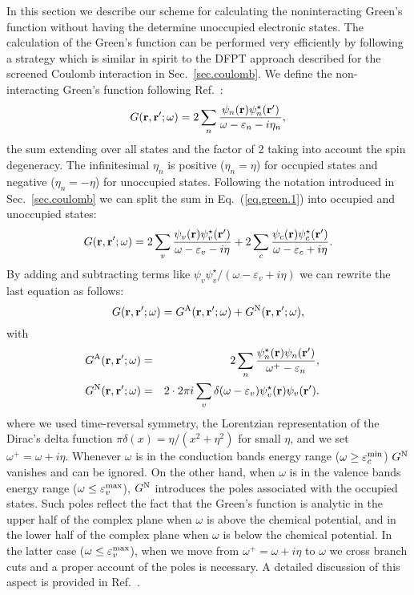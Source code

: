 \documentclass[twocolumn,prb,showpacs,superscriptaddress]{revtex4}
\def\w{\omega}
\def\E{\varepsilon}
\def\r{{\bf r}}
\def\rp{{\bf r^\prime}}
\begin{document}
In this section we describe our scheme for calculating the noninteracting
Green's function without having the determine unoccupied electronic states.
The calculation of the Green's function can be performed very efficiently
by following a strategy which is similar in spirit to the DFPT approach
described for the screened Coulomb interaction in Sec.\ \ref{sec.coulomb}.
We define the non-interacting Green's function following Ref.\ :
  \begin{equation}\label{eq.green.1}
  G(\r,\rp;\w) = 2\sum_n \frac{\psi_n(\r)\psi_n^\star(\rp)}{\w-\E_n-i\eta_n},
  \end{equation}
the sum extending over all states and the factor of 2 taking into account the
spin degeneracy.
The infinitesimal $\eta_n$ is positive ($\eta_n=\eta$) 
for occupied states and negative ($\eta_n=-\eta$) for unoccupied states.\cite{hl,hl86}
Following the notation introduced in Sec.\ \ref{sec.coulomb} we can split the
sum in Eq.~(\ref{eq.green.1}) into occupied and unoccupied states:
  \begin{equation}\label{eq.green.2}
  G(\r,\rp;\w) = 2\sum_v \frac{\psi_v(\r)\psi_v^\star(\rp)}{\w-\E_v-i\eta}
  + 2\sum_c \frac{\psi_c(\r)\psi_c^\star(\rp)}{\w-\E_c+i\eta}.
  \end{equation}
By adding and subtracting terms like $\psi_v\psi_v^\star/(\w-\E_v+i\eta)$
we can rewrite the last equation as follows:
  \begin{equation}\label{eq.green.split}
  G(\r,\rp;\w) = G^{\rm A}(\r,\rp;\w) + G^{\rm N}(\r,\rp;\w),
  \end{equation}
with 
  \begin{eqnarray}\label{eq.green.split.2}
\!\!\!\!\!\!  G^{\rm A}(\r,\rp;\w) & =&  2\sum_n \frac{\psi_n^\star(\r)\psi_n(\rp)}{\w^+-\E_n},  \\ 
\!\!\!\!\!\!  G^{\rm N}(\r,\rp;\w)  & = &  2\cdot 2\pi i \sum_v \delta(\w-\E_v) \psi_v^\star(\r)\psi_v(\rp). \label{eq.green.split.3} 
  \end{eqnarray}
where we used time-reversal symmetry, the Lorentzian representation of the Dirac's delta function
$\pi\delta(x)=\eta/(x^2+\eta^2)$ for small $\eta$, and we set $\w^+ = \w+i\eta$.
Whenever $\w$ is in the conduction bands energy range ($\w\ge\E_c^{\rm min}$)
$G^{\rm N}$ vanishes and can be ignored.
On the other hand, when $\w$ is in the valence bands energy range ($\w\le\E_v^{\rm max}$),
$G^{\rm N}$ introduces the poles associated with the occupied states.
Such poles reflect the fact that the Green's function is analytic in the upper
half of the complex plane when $\w$ is above the chemical potential, and in the lower half
of the complex plane when $\w$ is below the chemical potential.
In the latter case ($\w\le\E_v^{\rm max}$), when we move from $\w^+=\w+i\eta$ to $\w$ 
we cross branch cuts and a proper account of the poles is necessary. A detailed discussion of this
aspect is provided in Ref.\ .
\end{document}
